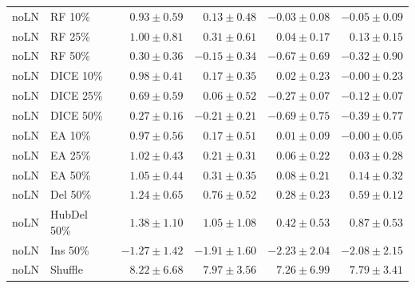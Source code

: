 {\begin{longtable}{llrrrr}
noLN & RF 10\% & $0.93\pm0.59$ & $0.13\pm0.48$ & $-0.03\pm0.08$ & $-0.05\pm0.09$ \\
noLN & RF 25\% & $1.00\pm0.81$ & $0.31\pm0.61$ & $0.04\pm0.17$ & $0.13\pm0.15$ \\
noLN & RF 50\% & $0.30\pm0.36$ & $-0.15\pm0.34$ & $-0.67\pm0.69$ & $-0.32\pm0.90$ \\
noLN & DICE 10\% & $0.98\pm0.41$ & $0.17\pm0.35$ & $0.02\pm0.23$ & $-0.00\pm0.23$ \\
noLN & DICE 25\% & $0.69\pm0.59$ & $0.06\pm0.52$ & $-0.27\pm0.07$ & $-0.12\pm0.07$ \\
noLN & DICE 50\% & $0.27\pm0.16$ & $-0.21\pm0.21$ & $-0.69\pm0.75$ & $-0.39\pm0.77$ \\
noLN & EA 10\% & $0.97\pm0.56$ & $0.17\pm0.51$ & $0.01\pm0.09$ & $-0.00\pm0.05$ \\
noLN & EA 25\% & $1.02\pm0.43$ & $0.21\pm0.31$ & $0.06\pm0.22$ & $0.03\pm0.28$ \\
noLN & EA 50\% & $1.05\pm0.44$ & $0.31\pm0.35$ & $0.08\pm0.21$ & $0.14\pm0.32$ \\
noLN & Del 50\% & $1.24\pm0.65$ & $0.76\pm0.52$ & $0.28\pm0.23$ & $0.59\pm0.12$ \\
noLN & HubDel 50\% & $1.38\pm1.10$ & $1.05\pm1.08$ & $0.42\pm0.53$ & $0.87\pm0.53$ \\
noLN & Ins 50\% & $-1.27\pm1.42$ & $-1.91\pm1.60$ & $-2.23\pm2.04$ & $-2.08\pm2.15$ \\
noLN & Shuffle & $8.22\pm6.68$ & $7.97\pm3.56$ & $7.26\pm6.99$ & $7.79\pm3.41$ \\
\end{longtable}
}

